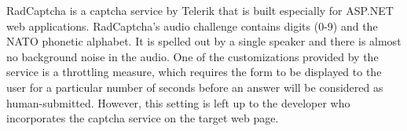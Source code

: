 RadCaptcha is a captcha service by Telerik that is built especially for ASP.NET 
web applications. 
RadCaptcha's audio challenge contains digits (0-9) and the NATO phonetic alphabet. It is 
spelled out by a single speaker and there is almost no background noise in the audio. 
One of the customizations provided by the service is a throttling measure, which requires the form to 
be displayed to the user for a particular number of seconds before an answer will be considered as 
human-submitted. However, this setting is left up to the developer who incorporates the captcha 
service on the target web page.


